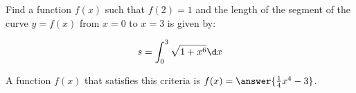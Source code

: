 \documentclass{ximera}
\author{Jim Talamo}
\begin{document}
\begin{exercise}

Find a function $f(x)$ such that $f(2)=1$ and the length of the segment of the curve $y=f(x)$ from $x=0$ to $x=3$ is given by:

\[
s= \int_0^3 \sqrt{1+x^6} \d x
\]

A function $f(x)$ that satisfies this criteria is $f(x) = \answer{\frac{1}{4}x^4-3}$.


\end{exercise}
\end{document}
